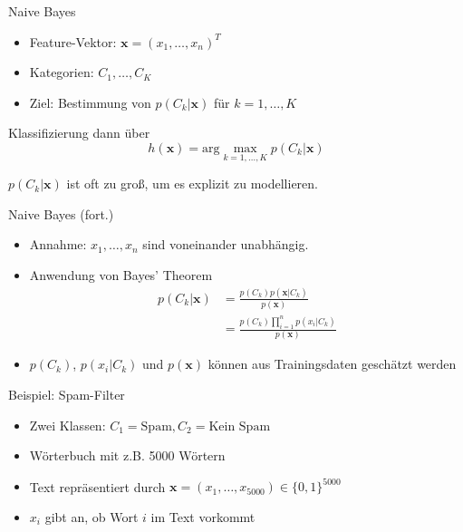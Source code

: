 \documentclass[xcolor={dvipsnames,svgnames},draft]{beamer}
\begin{document}
\begin{frame}{Naive Bayes}
  \begin{itemize}
  \item Feature-Vektor: $\mathbf{x} = (x_1,\ldots,x_n)^T$
  \item Kategorien: $C_1,\ldots,C_K$
  \item Ziel: Bestimmung von $p(C_k\vert \mathbf{x})$ für $k=1,\ldots,K$
  \end{itemize}
  
  \pause

  Klassifizierung dann über
  \[
    h(\mathbf{x}) = \text{arg}\max_{k=1,\ldots,K} p(C_k\vert \mathbf{x})
  \]

  \pause

  $p(C_k\vert \mathbf{x})$ ist oft zu groß, um es explizit zu modellieren.
\end{frame}

\begin{frame}{Naive Bayes (fort.)}
  \begin{itemize}
  \item Annahme: $x_1,\ldots,x_n$ sind voneinander unabhängig.
  \item Anwendung von Bayes' Theorem
    \begin{align*}
      p(C_k\vert \mathbf{x}) 
      &= \frac{p(C_k)p(\mathbf{x}|C_k)}{p(\mathbf{x})} \\
      &= \frac{p(C_k)\prod_{i=1}^n p(x_i|C_k)}{p(\mathbf{x})}
    \end{align*}
  \item $p(C_k)$, $p(x_i\vert C_k)$ und $p(\mathbf{x})$ können aus
    Trainingsdaten geschätzt werden
  \end{itemize}
\end{frame}

\begin{frame}{Beispiel: Spam-Filter}
  \begin{itemize}
  \item Zwei Klassen: $C_1=\text{Spam}, C_2=\text{Kein Spam}$
  \item Wörterbuch mit z.B. 5000 Wörtern
  \item Text repräsentiert durch $\mathbf{x} = (x_1,\ldots,x_{5000}) \in
    \{0,1\}^{5000}$ 
  \item $x_i$ gibt an, ob Wort $i$ im Text vorkommt
  \end{itemize}
\end{frame}
\end{document}
